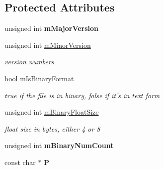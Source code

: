 \subsection*{Protected Attributes}
\begin{DoxyCompactItemize}
\item 
\hypertarget{class_assimp_1_1_x_file_parser_aab42914d86845e7a88ea6767632ec7da}{unsigned int {\bfseries m\+Major\+Version}}\label{class_assimp_1_1_x_file_parser_aab42914d86845e7a88ea6767632ec7da}

\item 
\hypertarget{class_assimp_1_1_x_file_parser_a5528290c5d79e9b4a8988ecac83ed52e}{unsigned int \hyperlink{class_assimp_1_1_x_file_parser_a5528290c5d79e9b4a8988ecac83ed52e}{m\+Minor\+Version}}\label{class_assimp_1_1_x_file_parser_a5528290c5d79e9b4a8988ecac83ed52e}

\begin{DoxyCompactList}\small\item\em version numbers \end{DoxyCompactList}\item 
\hypertarget{class_assimp_1_1_x_file_parser_a1f5fa376a323a3338d2158015d54ff95}{bool \hyperlink{class_assimp_1_1_x_file_parser_a1f5fa376a323a3338d2158015d54ff95}{m\+Is\+Binary\+Format}}\label{class_assimp_1_1_x_file_parser_a1f5fa376a323a3338d2158015d54ff95}

\begin{DoxyCompactList}\small\item\em true if the file is in binary, false if it's in text form \end{DoxyCompactList}\item 
\hypertarget{class_assimp_1_1_x_file_parser_a8d4ff63cc7513620cce26bd6cca536e1}{unsigned int \hyperlink{class_assimp_1_1_x_file_parser_a8d4ff63cc7513620cce26bd6cca536e1}{m\+Binary\+Float\+Size}}\label{class_assimp_1_1_x_file_parser_a8d4ff63cc7513620cce26bd6cca536e1}

\begin{DoxyCompactList}\small\item\em float size in bytes, either 4 or 8 \end{DoxyCompactList}\item 
\hypertarget{class_assimp_1_1_x_file_parser_af587c90c49d084d760570be0bd97fdc5}{unsigned int {\bfseries m\+Binary\+Num\+Count}}\label{class_assimp_1_1_x_file_parser_af587c90c49d084d760570be0bd97fdc5}

\item 
\hypertarget{class_assimp_1_1_x_file_parser_afda520b193185456b52e5816ab891e6a}{const char $\ast$ {\bfseries P}}\label{class_assimp_1_1_x_file_parser_afda520b193185456b52e5816ab891e6a}


\end{DoxyCompactItemize}
